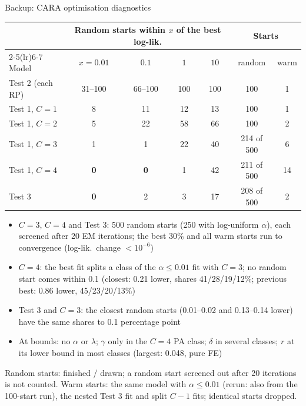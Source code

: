 \documentclass[aspectratio=169,11pt]{beamer}
\newcommand{\tabnote}[1]{\par\vfill{\scriptsize\color{muted}#1\par}}
\newcommand{\tight}{\setlength{\itemsep}{3pt}}
\begin{document}
\appendix

\begin{frame}{Backup: CARA optimisation diagnostics}
{\centering\footnotesize
\begin{tabular}{l cccc cc}
\toprule
& \multicolumn{4}{c}{Random starts within $x$ of the best log-lik.} & \multicolumn{2}{c}{Starts}\\
\cmidrule(lr){2-5}\cmidrule(lr){6-7}
Model & $x=0.01$ & $0.1$ & $1$ & $10$ & random & warm\\
\midrule
Test 2 (each RP) & 31--100 & 66--100 & 100 & 100 & 100 & 1\\
Test 1, $C=1$ & 8 & 11 & 12 & 13 & 100 & 1\\
Test 1, $C=2$ & 5 & 22 & 58 & 66 & 100 & 2\\
Test 1, $C=3$ & 1 & 1 & 22 & 40 & 214 of 500 & 6\\
Test 1, $C=4$ & \textbf{0} & \textbf{0} & 1 & 42 & 211 of 500 & 14\\
Test 3 & \textbf{0} & 2 & 3 & 17 & 208 of 500 & 2\\
\bottomrule
\end{tabular}\par}
\begin{itemize}\small\tight
  \item $C=3$, $C=4$ and Test 3: 500 random starts (250 with log-uniform $\alpha$), each screened after 20 EM iterations; the best 30\% and all warm starts run to convergence (log-lik.\ change $<10^{-6}$)
  \item $C=4$: the best fit splits a class of the $\alpha\le 0.01$ fit with $C=3$; no random start comes within 0.1 (closest: 0.21 lower, shares 41/28/19/12\%; previous best: 0.86 lower, 45/23/20/13\%)
  \item Test 3 and $C=3$: the closest random starts (0.01--0.02 and 0.13--0.14 lower) have the same shares to 0.1 percentage point
  \item At bounds: no $\alpha$ or $\lambda$; $\gamma$ only in the $C=4$ PA class; $\delta$ in several classes; $r$ at its lower bound in most classes (largest: 0.048, pure FE)
\end{itemize}
\tabnote{Random starts: finished / drawn; a random start screened out after 20 iterations is not counted. Warm starts: the same model with $\alpha\le 0.01$ (rerun: also from the 100-start run), the nested Test 3 fit and split $C-1$ fits; identical starts dropped.}
\end{frame}
\end{document}
